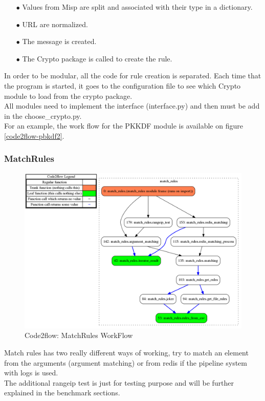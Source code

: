\documentclass{eplmastersthesis}
\begin{document}
\begin{itemize}
\item[$\bullet$] Values from Misp are split and associated with their type in a dictionary.
\item[$\bullet$] URL are normalized.
\item[$\bullet$] The message is created.
\item[$\bullet$] The Crypto package is called to create the rule.
\end{itemize}

In order to be modular, all the code for rule creation is separated. Each time that the program is started, it goes to the configuration file to see which Crypto module to load from the crypto package.\\
All modules need to implement the interface (interface.py) and then must be add in the choose\_crypto.py.\\
For an example, the work flow for the PKKDF module is available on figure \ref{code2flow-pbkdf2}.

\subsubsection{MatchRules}
\begin{figure}[h!]
\begin{center}
	\includegraphics[scale=0.3]{res/flowMatchRules}
	\caption{Code2flow: MatchRules WorkFlow}
	\label{code2flow-matchRules}
\end{center}
\end{figure}

Match rules has two really different ways of working, try to match an element from the arguments (argument matching) or from redis if the pipeline system with logs is used.\\
The additional rangeip test is just for testing purpose and will be further explained in the benchmark sections.\\
\end{document}
